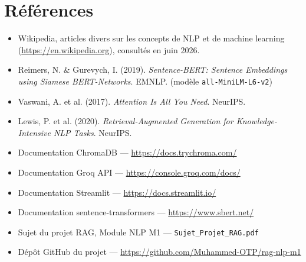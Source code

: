 \section{R\'ef\'erences}
\label{sec:refs}

\begin{itemize}[leftmargin=*]
  \item Wikipedia, articles divers sur les concepts de NLP et de machine learning
        (\url{https://en.wikipedia.org}), consult\'es en juin 2026.
  \item Reimers, N. \& Gurevych, I. (2019). \emph{Sentence-BERT: Sentence Embeddings using Siamese
        BERT-Networks}. EMNLP. (mod\`ele \texttt{all-MiniLM-L6-v2})
  \item Vaswani, A. et al. (2017). \emph{Attention Is All You Need}. NeurIPS.
  \item Lewis, P. et al. (2020). \emph{Retrieval-Augmented Generation for Knowledge-Intensive NLP
        Tasks}. NeurIPS.
  \item Documentation ChromaDB --- \url{https://docs.trychroma.com/}
  \item Documentation Groq API --- \url{https://console.groq.com/docs/}
  \item Documentation Streamlit --- \url{https://docs.streamlit.io/}
  \item Documentation sentence-transformers --- \url{https://www.sbert.net/}
  \item Sujet du projet RAG, Module NLP M1 --- \texttt{Sujet\_Projet\_RAG.pdf}
  \item D\'ep\^ot GitHub du projet --- \url{https://github.com/Muhammed-OTP/rag-nlp-m1}
\end{itemize}
